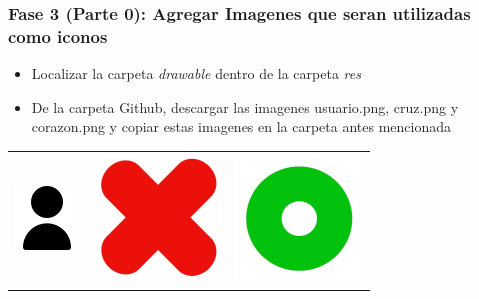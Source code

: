 \begin{frame}[fragile]
\frametitle{Fase 3 (Parte 0): Agregar Imagenes que seran utilizadas como iconos} 
\begin{itemize}
\item Localizar la carpeta \textit{drawable} dentro de la carpeta \textit{res}
\item De la carpeta Github, descargar las imagenes usuario.png, cruz.png y corazon.png y copiar estas imagenes en la carpeta antes mencionada
\end{itemize}
\begin{center}
\begin{tabular}{ccc}
\includegraphics[width=0.32\linewidth]{00_CambiosInterfaz/usuario.png}  &
\includegraphics[width=0.32\linewidth]{00_CambiosInterfaz/cruz.png}  &
\includegraphics[width=0.32\linewidth]{00_CambiosInterfaz/corazon.png}   
\end{tabular}
\end{center}
\end{frame}


